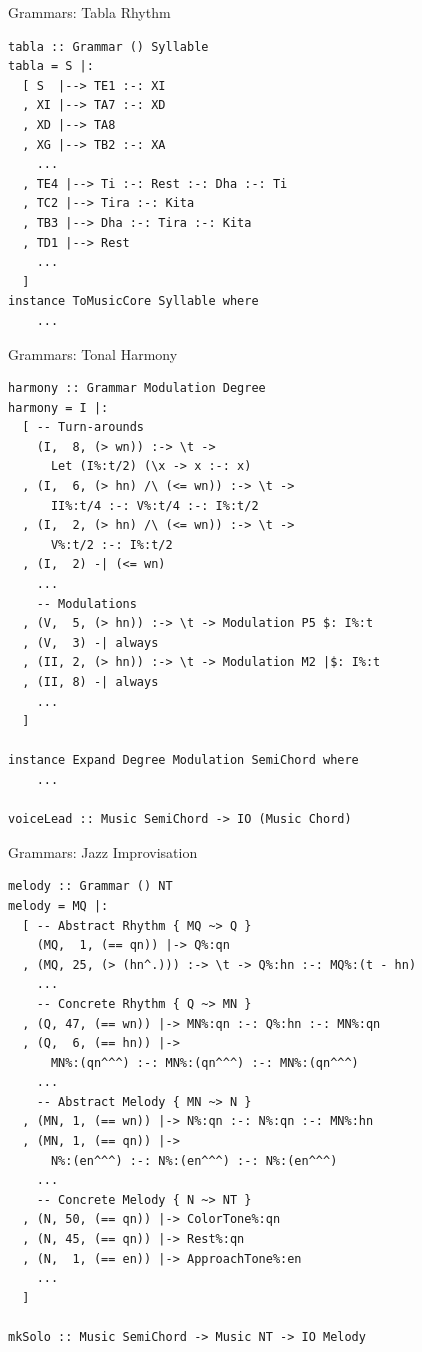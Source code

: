 \documentclass{beamer}
\begin{document}
	\begin{frame}[fragile=singleslide]{Grammars: Tabla Rhythm}
	\begin{verbatim}
tabla :: Grammar () Syllable
tabla = S |:
  [ S  |--> TE1 :-: XI
  , XI |--> TA7 :-: XD
  , XD |--> TA8
  , XG |--> TB2 :-: XA
    ...
  , TE4 |--> Ti :-: Rest :-: Dha :-: Ti
  , TC2 |--> Tira :-: Kita
  , TB3 |--> Dha :-: Tira :-: Kita
  , TD1 |--> Rest
    ...
  ]
instance ToMusicCore Syllable where
    ...
	\end{verbatim}
	\end{frame}

	\begin{frame}[fragile=singleslide]{Grammars: Tonal Harmony}
	\begin{verbatim}
harmony :: Grammar Modulation Degree
harmony = I |:
  [ -- Turn-arounds
    (I,  8, (> wn)) :-> \t ->
      Let (I%:t/2) (\x -> x :-: x)
  , (I,  6, (> hn) /\ (<= wn)) :-> \t ->
      II%:t/4 :-: V%:t/4 :-: I%:t/2
  , (I,  2, (> hn) /\ (<= wn)) :-> \t ->
      V%:t/2 :-: I%:t/2
  , (I,  2) -| (<= wn)
    ...
    -- Modulations
  , (V,  5, (> hn)) :-> \t -> Modulation P5 $: I%:t
  , (V,  3) -| always
  , (II, 2, (> hn)) :-> \t -> Modulation M2 |$: I%:t
  , (II, 8) -| always
    ...
  ]

instance Expand Degree Modulation SemiChord where
    ...

voiceLead :: Music SemiChord -> IO (Music Chord)
	\end{verbatim}
	\end{frame}

	\begin{frame}[fragile=singleslide]{Grammars: Jazz Improvisation}
	\begin{verbatim}
melody :: Grammar () NT
melody = MQ |:
  [ -- Abstract Rhythm { MQ ~> Q }
    (MQ,  1, (== qn)) |-> Q%:qn
  , (MQ, 25, (> (hn^.))) :-> \t -> Q%:hn :-: MQ%:(t - hn)
    ...
    -- Concrete Rhythm { Q ~> MN }
  , (Q, 47, (== wn)) |-> MN%:qn :-: Q%:hn :-: MN%:qn
  , (Q,  6, (== hn)) |->
      MN%:(qn^^^) :-: MN%:(qn^^^) :-: MN%:(qn^^^)
    ...
    -- Abstract Melody { MN ~> N }
  , (MN, 1, (== wn)) |-> N%:qn :-: N%:qn :-: MN%:hn
  , (MN, 1, (== qn)) |->
      N%:(en^^^) :-: N%:(en^^^) :-: N%:(en^^^)
    ...
    -- Concrete Melody { N ~> NT }
  , (N, 50, (== qn)) |-> ColorTone%:qn
  , (N, 45, (== qn)) |-> Rest%:qn
  , (N,  1, (== en)) |-> ApproachTone%:en
    ...
  ]

mkSolo :: Music SemiChord -> Music NT -> IO Melody
    \end{verbatim}
	\end{frame}
\end{document}
